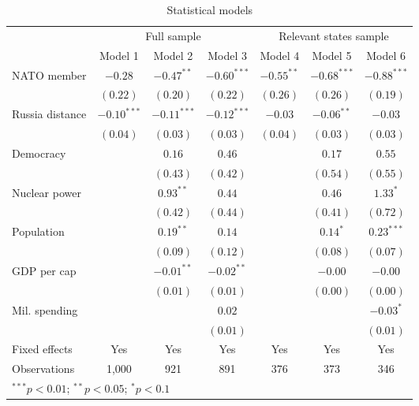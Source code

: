 
\begin{table}[h]
\begin{center}
\begin{tabular}{l c c c c c c}
\hline
 & \multicolumn{3}{c}{Full sample} & \multicolumn{3}{c}{Relevant states sample} \\
\cline{2-4} \cline{5-7}
 & Model 1 & Model 2 & Model 3 & Model 4 & Model 5 & Model 6 \\
\hline
NATO member     & $-0.28$       & $-0.47^{**}$  & $-0.60^{***}$ & $-0.55^{**}$ & $-0.68^{***}$ & $-0.88^{***}$ \\
                & $(0.22)$      & $(0.20)$      & $(0.22)$      & $(0.26)$     & $(0.26)$      & $(0.19)$      \\
Russia distance & $-0.10^{***}$ & $-0.11^{***}$ & $-0.12^{***}$ & $-0.03$      & $-0.06^{**}$  & $-0.03$       \\
                & $(0.04)$      & $(0.03)$      & $(0.03)$      & $(0.04)$     & $(0.03)$      & $(0.03)$      \\
Democracy       &               & $0.16$        & $0.46$        &              & $0.17$        & $0.55$        \\
                &               & $(0.43)$      & $(0.42)$      &              & $(0.54)$      & $(0.55)$      \\
Nuclear power   &               & $0.93^{**}$   & $0.44$        &              & $0.46$        & $1.33^{*}$    \\
                &               & $(0.42)$      & $(0.44)$      &              & $(0.41)$      & $(0.72)$      \\
Population      &               & $0.19^{**}$   & $0.14$        &              & $0.14^{*}$    & $0.23^{***}$  \\
                &               & $(0.09)$      & $(0.12)$      &              & $(0.08)$      & $(0.07)$      \\
GDP per cap     &               & $-0.01^{**}$  & $-0.02^{**}$  &              & $-0.00$       & $-0.00$       \\
                &               & $(0.01)$      & $(0.01)$      &              & $(0.00)$      & $(0.00)$      \\
Mil. spending   &               &               & $0.02$        &              &               & $-0.03^{*}$   \\
                &               &               & $(0.01)$      &              &               & $(0.01)$      \\
\hline
Fixed effects   & Yes           & Yes           & Yes           & Yes          & Yes           & Yes           \\
Observations    & 1,000         & 921           & 891           & 376          & 373           & 346           \\
\hline
\multicolumn{7}{l}{\scriptsize{$^{***}p<0.01$; $^{**}p<0.05$; $^{*}p<0.1$}}
\end{tabular}
\caption{Statistical models}
\label{table:coefficients}
\end{center}
\end{table}

